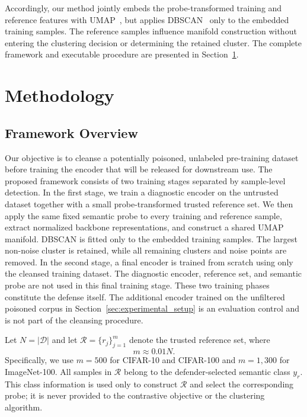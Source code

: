 \documentclass[10pt,journal]{IEEEtran}
\begin{document}
Accordingly, our method jointly embeds the probe-transformed training
and reference features with UMAP~\cite{McInnes2018UMAP}, but applies
DBSCAN~\cite{Ester1996DBSCAN} only to the embedded training samples.
The reference samples influence manifold construction without entering
the clustering decision or determining the retained cluster. The
complete framework and executable procedure are presented in
Section~\ref{sec:method}.
\section{Methodology}\label{sec:method}
\subsection{Framework Overview}
\label{sec:method_overview}

Our objective is to cleanse a potentially poisoned, unlabeled
pre-training dataset before training the encoder that will be released
for downstream use. The proposed framework consists of two training
stages separated by sample-level detection. In the first stage, we
train a diagnostic encoder on the untrusted dataset together with a
small probe-transformed trusted reference set. We then apply the same
fixed semantic probe to every training and reference sample, extract
normalized backbone representations, and construct a shared UMAP
manifold. DBSCAN is fitted only to the embedded training samples. The
largest non-noise cluster is retained, while all remaining clusters
and noise points are removed. In the second stage, a final encoder is
trained from scratch using only the cleansed training dataset. The
diagnostic encoder, reference set, and semantic probe are not used in
this final training stage.
These two training phases constitute the defense itself. The additional
encoder trained on the unfiltered poisoned corpus in
Section~\ref{sec:experimental_setup} is an evaluation control and is not
part of the cleansing procedure.

Let $N=|\mathcal{D}|$ and let
$\mathcal{R}=\{r_j\}_{j=1}^{m}$ denote the trusted reference set,
where
\begin{equation}
    m\approx0.01N.
    \label{eq:reference_budget}
\end{equation}
Specifically, we use $m=500$ for CIFAR-10 and CIFAR-100 and
$m=1{,}300$ for ImageNet-100.
All samples in $\mathcal{R}$ belong to the defender-selected semantic
class $y_r$. This class information is used only to construct
$\mathcal{R}$ and select the corresponding probe; it is never provided
to the contrastive objective or the clustering algorithm.
\end{document}
